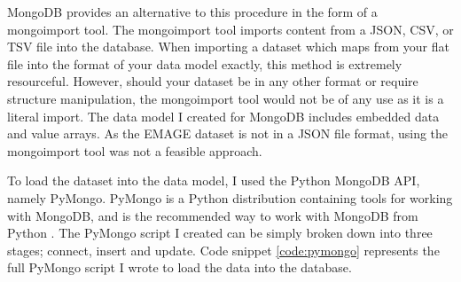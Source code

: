 MongoDB provides an alternative to this procedure in the form of a mongoimport tool. The mongoimport tool imports content from a JSON, CSV, or TSV file into the database. When importing a dataset which maps from your flat file into the format of your data model exactly, this method is extremely resourceful. However, should your dataset be in any other format or require structure manipulation, the mongoimport tool would not be of any use as it is a literal import. The data model I created for MongoDB includes embedded data and value arrays. As the EMAGE dataset is not in a JSON file format, using the mongoimport tool was not a feasible approach.

To load the dataset into the data model, I used the Python MongoDB API, namely PyMongo. PyMongo is a Python distribution containing tools for working with MongoDB, and is the recommended way to work with MongoDB from Python \cite{mongo}. The PyMongo script I created can be simply broken down into three stages; connect, insert and update. Code snippet \ref{code:pymongo} represents the full PyMongo script I wrote to load the data into the database.\\[2em]

